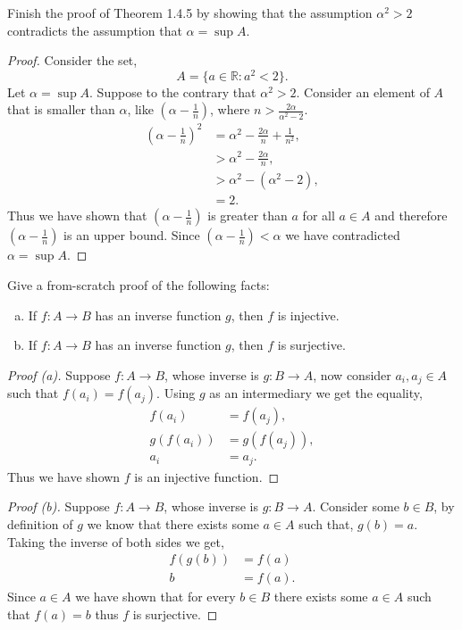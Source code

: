 \documentclass[12pt]{article}
\makeatletter
\theoremstyle{homework}
\newenvironment{exercise}[1]
{\def\@currentlabel{#1}\exercisecore}
{\endexercisecore}
\newcommand{\Reals}{\ensuremath{\mathbb R}}
\makeatother
\begin{document}
\begin{exercise}{1.4.7} Finish the proof of Theorem 1.4.5 by
showing that the assumption $\alpha^2>2$ contradicts the
assumption that $\alpha=\sup A$.
\end{exercise}
\begin{proof} Consider the set,
  \begin{equation*}
    A = \{a \in \Reals : a^2<2\}.
  \end{equation*}
Let $\alpha = \sup A$. Suppose to the contrary that $\alpha^2>2$. Consider an element 
of $A$ that is smaller than $\alpha$, like $(\alpha - \frac{1}{n})$, where $n > \frac{2\alpha}{\alpha^2 - 2}$.
\begin{align*}
  (\alpha - \frac{1}{n})^2 &= \alpha^2 - \frac{2\alpha}{n} + \frac{1}{n^2},\\
  &> \alpha^2 - \frac{2\alpha}{n},\\
  &> \alpha^2 - (\alpha^2 - 2),\\
  &= 2.
\end{align*}
Thus we have shown that $ (\alpha - \frac{1}{n})$ is greater than $a$ for all $a \in A$ and therefore $ (\alpha - \frac{1}{n})$ is an upper bound.
Since $(\alpha - \frac{1}{n})<\alpha$ we have contradicted $\alpha = \sup A$.


\end{proof}

\begin{exercise}{Supplemental 1} Give a from-scratch
proof of the following facts:
\begin{enumerate}[(a)]
\item If $f:A\to B$ has an inverse function $g$, then
$f$ is injective.
\item If $f:A\to B$ has an inverse function $g$, then
$f$ is surjective.
\end{enumerate}
\end{exercise}
\begin{proof}[Proof (a)]
Suppose $f:A\to B$, whose inverse is $g:B\to A$, now consider $a_i,a_j \in A$ such that $f(a_i) = f(a_j)$. Using $g$ as 
an intermediary we get the equality,
\begin{align*}
  f(a_i) &= f(a_j),\\
  g(f(a_i)) &= g(f(a_j)),\\
  a_i &= a_j.
\end{align*}
Thus we have shown $f$ is an injective function.
\end{proof}
\begin{proof}[Proof (b)]
  Suppose $f:A \to B$, whose inverse is $g:B \to A$. Consider some $b \in B$, by definition of $g$ we know that
  there exists some $a \in A$ such that, $g(b) = a$. Taking the inverse of both sides we get,
  \begin{align*}
    f(g(b)) &= f(a)\\
    b &= f(a).
  \end{align*}
  Since $a \in A$ we have shown that for every $b \in B$ there exists some $a \in A$ such that $f(a) = b$ thus $f$ is surjective. 
\end{proof}
\end{document}
